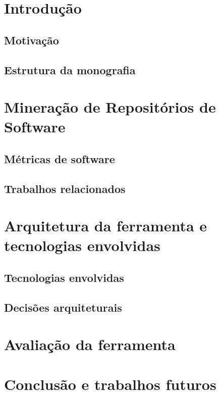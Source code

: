 \documentclass[a4paper, 12pt, twoside]{book}
\begin{document}
\pagestyle{plain}
\setcounter{page}{1} 
\tableofcontents

\newpage

\setcounter{page}{1}

\chapter{Introdução}

    \section{Motivação}
    
    \section{Estrutura da monografia}

\chapter{Mineração de Repositórios de Software}

    \section{Métricas de software}
    
    \section{Trabalhos relacionados}

\chapter{Arquitetura da ferramenta e tecnologias envolvidas}

    \section{Tecnologias envolvidas}
    
    \section{Decisões arquiteturais}
    
\chapter{Avaliação da ferramenta}

\chapter{Conclusão e trabalhos futuros}
\end{document}
